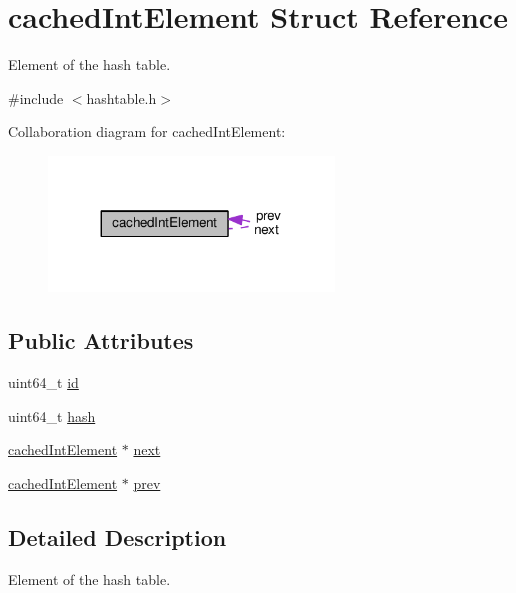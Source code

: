 \hypertarget{structcachedIntElement}{}\section{cached\+Int\+Element Struct Reference}
\label{structcachedIntElement}


Element of the hash table.  




{\ttfamily \#include $<$hashtable.\+h$>$}



Collaboration diagram for cached\+Int\+Element\+:\nopagebreak
\begin{figure}[H]
\begin{center}
\leavevmode
\includegraphics[width=215pt]{structcachedIntElement__coll__graph}
\end{center}
\end{figure}
\subsection*{Public Attributes}
\begin{DoxyCompactItemize}
\item 
uint64\+\_\+t \hyperlink{structcachedIntElement_acda821458cfe34dda3bff8b7b0373fb9}{id}
\item 
uint64\+\_\+t \hyperlink{structcachedIntElement_a20d62592d37c7e8c91449f534431aeb9}{hash}
\item 
\hyperlink{structcachedIntElement}{cached\+Int\+Element} $\ast$ \hyperlink{structcachedIntElement_ae64f5fae8aa27243af30ef13cb3ebce6}{next}
\item 
\hyperlink{structcachedIntElement}{cached\+Int\+Element} $\ast$ \hyperlink{structcachedIntElement_a90b30c8883b80e42fbf59fbc1bc8727a}{prev}
\end{DoxyCompactItemize}


\subsection{Detailed Description}
Element of the hash table. 

